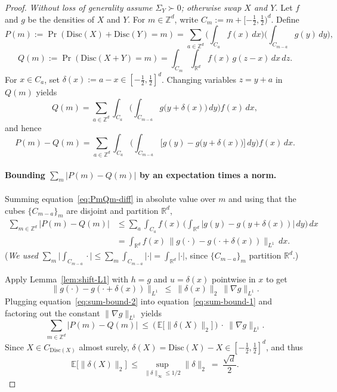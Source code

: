 \documentclass[10pt,a4paper]{amsart}
\def\eqref#1{equation~\ref{#1}}
\newcommand{\disc}{\mathrm{Disc}}
\begin{document}
\begin{proof}
\emph{Without loss of generality assume $\Sigma_Y\succ 0$; otherwise swap $X$ and $Y$.}
Let $f$ and $g$ be the densities of $X$ and $Y$. For $m\in\mathbb{Z}^d$, write $C_m:=m+[-\tfrac12,\tfrac12)^d$.
Define
\[
P(m):=\Pr(\disc(X)+\disc(Y)=m)
=\sum_{a\in\mathbb{Z}^d}\Big(\int_{C_a} f(x)\,dx\Big)\Big(\int_{C_{m-a}} g(y)\,dy\Big),
\]
\[
Q(m):=\Pr(\disc(X+Y)=m)
=\int_{C_m}\int_{\mathbb{R}^d} f(x)\,g(z-x)\,dx\,dz.
\]
For $x\in C_a$, set $\delta(x):=a-x\in[-\tfrac12,\tfrac12]^d$. Changing variables $z=y+a$ in $Q(m)$ yields
\[
Q(m)=\sum_{a\in\mathbb{Z}^d}\int_{C_a}\!\Big(\int_{C_{m-a}} g\big(y+\delta(x)\big)\,dy\Big) f(x)\,dx,
\]
and hence
\begin{equation}\label{eq:PmQm-diff}
P(m)-Q(m)
=\sum_{a\in\mathbb{Z}^d}\int_{C_a}\!\Big(\int_{C_{m-a}}\!\big[g(y)-g\big(y+\delta(x)\big)\big]\,dy\Big) f(x)\,dx.
\end{equation}

\paragraph{Bounding $\sum_m |P(m)-Q(m)|$ by an expectation times a norm.}
Summing \eqref{eq:PmQm-diff} in absolute value over $m$ and using that the cubes $\{C_{m-a}\}_m$ are disjoint and partition $\mathbb{R}^d$,
\begin{align}
\sum_{m\in\mathbb{Z}^d}\!|P(m)-Q(m)|
&\le \sum_{a}\int_{C_a} f(x)\,\Big(\int_{\mathbb{R}^d}\!\big|g(y)-g(y+\delta(x))\big|\,dy\Big)\,dx \nonumber\\
&= \int_{\mathbb{R}^d} f(x)\,\big\|g(\cdot)-g(\cdot+\delta(x))\big\|_{L^1}\,dx.
\label{eq:sum-bound-1}
\end{align}
(\emph{We used }$\sum_m\big|\int_{C_{m-a}}\!\cdot\big|
\le \sum_m\int_{C_{m-a}}\!|\cdot|
= \int_{\mathbb{R}^d}\!|\cdot|$,
since $\{C_{m-a}\}_m$ partition $\mathbb{R}^d$.)

Apply Lemma~\ref{lem:shift-L1} with $h=g$ and $u=\delta(x)$ pointwise in $x$ to get
\begin{equation}\label{eq:sum-bound-2}
\big\|g(\cdot)-g(\cdot+\delta(x))\big\|_{L^1}\ \le\ \|\delta(x)\|_2\ \|\nabla g\|_{L^1}.
\end{equation}
Plugging \eqref{eq:sum-bound-2} into \eqref{eq:sum-bound-1} and factoring out the constant $\|\nabla g\|_{L^1}$ yields
\begin{equation}\label{eq:product-form}
\sum_{m\in\mathbb{Z}^d}\!|P(m)-Q(m)|
\ \le\ \Big(\,\mathbb{E}\big[\|\delta(X)\|_2\big]\,\Big)\ \cdot\ \|\nabla g\|_{L^1}.
\end{equation}
Since $X\in C_{\disc(X)}$ almost surely, $\delta(X)=\disc(X)-X\in[-\tfrac12,\tfrac12]^d$, and thus
\begin{equation}\label{eq:delta-expect}
\mathbb{E}\big[\|\delta(X)\|_2\big]\ \le\ \sup_{\|\delta\|_\infty\le 1/2}\|\delta\|_2\ =\ \frac{\sqrt{d}}{2}.
\end{equation}


\end{proof}
\end{document}
